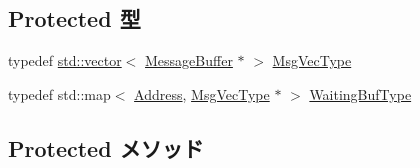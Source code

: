 \subsection*{Protected 型}
\begin{DoxyCompactItemize}
\item 
typedef \hyperlink{classstd_1_1vector}{std::vector}$<$ \hyperlink{classMessageBuffer}{MessageBuffer} $\ast$ $>$ \hyperlink{classAbstractController_a7c9a43de9f27c3319add6df9c0d2e948}{MsgVecType}
\item 
typedef std::map$<$ \hyperlink{classAddress}{Address}, \hyperlink{classstd_1_1vector}{MsgVecType} $\ast$ $>$ \hyperlink{classAbstractController_afcfa4bb0b120bb22dce11fc367b702af}{WaitingBufType}
\end{DoxyCompactItemize}
\subsection*{Protected メソッド}
